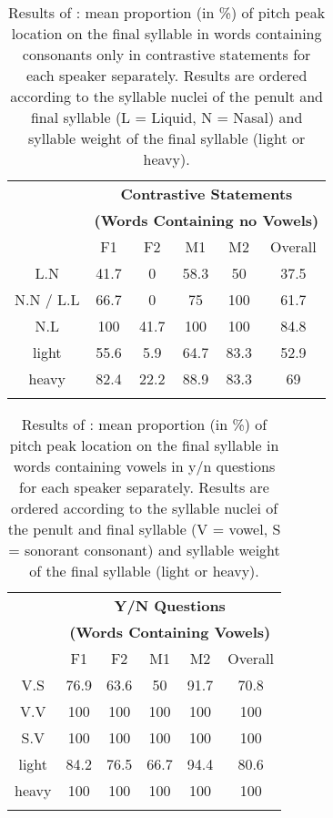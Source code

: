\begin{table}
\centering
\caption{Results of \citet[250f.]{Grice.etal2015tash}: mean proportion (in \%) of pitch peak location on the final syllable in words containing consonants only in contrastive statements for each speaker separately. Results are ordered according to the syllable nuclei of the penult and final syllable (L = Liquid, N = Nasal) and syllable weight of the final syllable (light or heavy).}
\label{tab:5.6}
\begin{tabular}{cccccc}
\lsptoprule
      & \multicolumn{5}{c}{\textbf{Contrastive Statements}}\\
      & \multicolumn{5}{c}{\textbf{(Words Containing no Vowels)}} \\
\cmidrule {2-6}
          & F1        & F2        & M1        & M2       & Overall     \\
\midrule
L.N       & 41.7      & 0         & 58.3      & 50       & 37.5        \\
N.N / L.L & 66.7      & 0         & 75        & 100      & 61.7        \\
N.L       & 100       & 41.7      & 100       & 100      & 84.8        \\
\midrule
light     & 55.6      & 5.9       & 64.7      & 83.3     & 52.9        \\
heavy     & 82.4      & 22.2      & 88.9      & 83.3     & 69          \\
\lspbottomrule
\end{tabular}
\end{table}

\begin{table}
\centering
\caption{Results of \citet[250f.]{Grice.etal2015tash}: mean proportion (in \%) of pitch peak location on the final syllable in words containing vowels in y/n questions for each speaker separately. Results are ordered according to the syllable nuclei of the penult and final syllable (V = vowel, S = sonorant consonant) and syllable weight of the final syllable (light or heavy).}
\label{tab:5.7}
\begin{tabular}{cccccc}
\lsptoprule
      & \multicolumn{5}{c}{\textbf{Y/N Questions}} \\ 
      & \multicolumn{5}{c}{\textbf{(Words Containing Vowels)}} \\
\cmidrule {2-6}
          & F1        & F2        & M1        & M2             & Overall     \\
\midrule
V.S   & 76.9 & 63.6 & 50   & 91.7 &  70.8 \\
V.V   & 100  & 100  & 100  & 100  &   100  \\
S.V   & 100  & 100  & 100  & 100  &   100  \\
\midrule
light & 84.2 & 76.5 & 66.7 & 94.4 &   80.6 \\
heavy & 100  & 100  & 100  & 100  &   100  \\
\lspbottomrule
\end{tabular}
\end{table}

